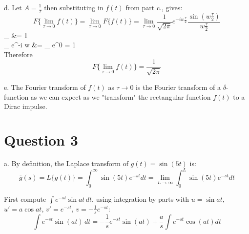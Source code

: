 \documentclass[12pt,twoside]{article}
\begin{document}
\item [d.]
Let $A=\frac{1}{\tau}$ then substituting in $f(t)$	from part c., gives:
\[
	F\{ \lim_{\tau \rightarrow 0} f(t) \} =  \lim_{\tau \rightarrow 0}  F\{ f(t) \} =  \lim_{\tau \rightarrow 0}   \frac{1}  {\sqrt{2 \pi}}  e^{-i w \frac{\tau}{2}} \frac{ \sin(w \frac{\tau}{2}) } {w \frac{\tau}{2}}
\]
\ba
	 \lim_{\theta {}} \frac{\sin(\theta)} {\theta} &= 1 ~  \\
	  \lim_{\tau {}}  e^{-i w } 		&=   \lim_{\tau {}} e^0 = 1 \\
\ea
Therefore
\[
	F\{ \lim_{\tau \rightarrow 0} f(t) \} =  \frac{1}  {\sqrt{2 \pi}} 
\]

\item [e.]
The Fourier transform of $f(t)$ as $\tau  \rightarrow 0$ is the Fourier transform of a $\delta$-function as we can expect as we "transform" the rectangular function $f(t)$ to a Dirac impulse.
\ee

\section*{Question 3}

\be

\item [a.]
By definition, the Laplace transform of $g(t) = \sin(5t)$ is:
\[
	\bar{g}(s) = L\{g(t)\} = \int_0^\infty \sin(5t) e^{-st} dt = \lim_{L  \rightarrow \infty}  \int_0^L \sin(5t) e^{-st} dt
\]

First compute $\int e^{-st} \sin at \, dt$, using integration by parts with $u=\sin at$, $u' = a \cos at$, $v'=e^{-st}$, $v=-\frac{1}{s} e^{-st}$:
\begin{equation}
 \int e^{-st} \sin(at) \, dt = -\frac{1}{s} e^{-st} \sin(at) + \frac{a}{s} \int e^{-st} \cos(at) dt 
\end{equation}
\end{document}
